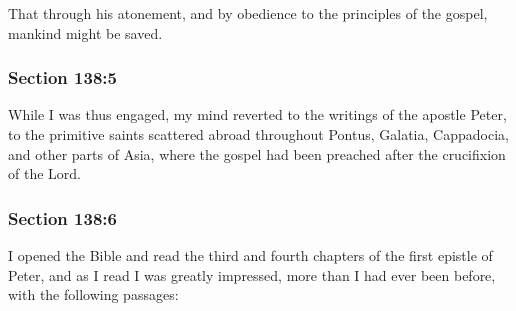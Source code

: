 		That through his atonement, and by obedience to the principles of the gospel, mankind might be saved.


	\subsubsection{Section 138:5} %
		\label{DC138-5}

		While I was thus engaged, my mind reverted to the writings of the apostle Peter, to the primitive saints scattered abroad throughout Pontus, Galatia, Cappadocia, and other parts of Asia, where the gospel had been preached after the crucifixion of the Lord.


	\subsubsection{Section 138:6} %
		\label{DC138-6}

		I opened the Bible and read the third and fourth chapters of the first epistle of Peter, and as I read I was greatly impressed, more than I had ever been before, with the following passages:



